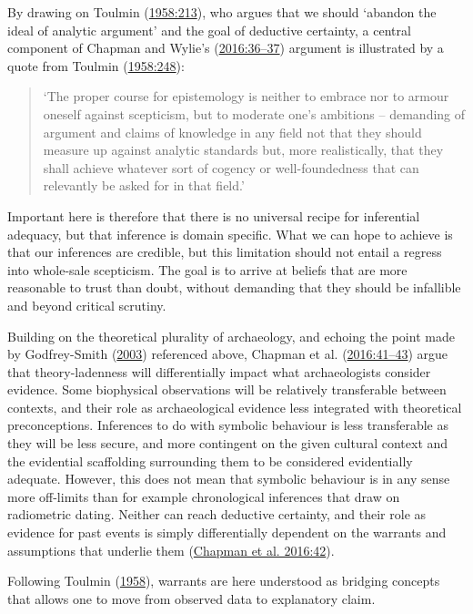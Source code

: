 \documentclass[
  a4paper,
  oneside]{uiophdthesis}
\begin{document}
By drawing on Toulmin (\protect\hyperlink{ref-toulmin1958}{1958:213}), who argues that we should `abandon the ideal of analytic argument' and the goal of deductive certainty, a central component of Chapman and Wylie's (\protect\hyperlink{ref-chapman2016}{2016:36--37}) argument is illustrated by a quote from Toulmin (\protect\hyperlink{ref-toulmin1958}{1958:248}):

\begin{quote}
`The proper course for epistemology is neither to embrace nor to armour oneself against scepticism, but to moderate one's ambitions -- demanding of argument and claims of knowledge in any field not that they should measure up against analytic standards but, more realistically, that they shall achieve whatever sort of cogency or well-foundedness that can relevantly be asked for in that field.'
\end{quote}

Important here is therefore that there is no universal recipe for inferential adequacy, but that inference is domain specific. What we can hope to achieve is that our inferences are credible, but this limitation should not entail a regress into whole-sale scepticism. The goal is to arrive at beliefs that are more reasonable to trust than doubt, without demanding that they should be infallible and beyond critical scrutiny.

Building on the theoretical plurality of archaeology, and echoing the point made by Godfrey-Smith (\protect\hyperlink{ref-godfrey-smith2003}{2003}) referenced above, Chapman et al. (\protect\hyperlink{ref-chapman2016}{2016:41--43}) argue that theory-ladenness will differentially impact what archaeologists consider evidence. Some biophysical observations will be relatively transferable between contexts, and their role as archaeological evidence less integrated with theoretical preconceptions. Inferences to do with symbolic behaviour is less transferable as they will be less secure, and more contingent on the given cultural context and the evidential scaffolding surrounding them to be considered evidentially adequate. However, this does not mean that symbolic behaviour is in any sense more off-limits than for example chronological inferences that draw on radiometric dating. Neither can reach deductive certainty, and their role as evidence for past events is simply differentially dependent on the warrants and assumptions that underlie them (\protect\hyperlink{ref-chapman2016}{Chapman et al. 2016:42}).

Following Toulmin (\protect\hyperlink{ref-toulmin1958}{1958}), warrants are here understood as bridging concepts that allows one to move from observed data to explanatory claim.
\end{document}
